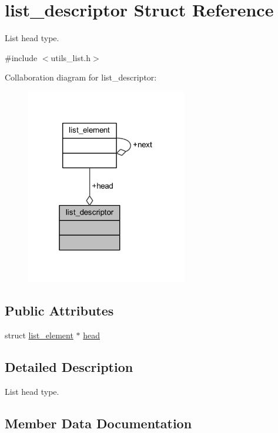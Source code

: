 \hypertarget{structlist__descriptor}{}\section{list\+\_\+descriptor Struct Reference}
\label{structlist__descriptor}


List head type.  




{\ttfamily \#include $<$utils\+\_\+list.\+h$>$}



Collaboration diagram for list\+\_\+descriptor\+:\nopagebreak
\begin{figure}[H]
\begin{center}
\leavevmode
\includegraphics[width=199pt]{structlist__descriptor__coll__graph}
\end{center}
\end{figure}
\subsection*{Public Attributes}
\begin{DoxyCompactItemize}
\item 
struct \hyperlink{structlist__element}{list\+\_\+element} $\ast$ \hyperlink{structlist__descriptor_acc7a3bb5c92dc985a2a7c27c958f1ed8}{head}
\end{DoxyCompactItemize}


\subsection{Detailed Description}
List head type. 

\subsection{Member Data Documentation}
\mbox{\label{structlist__descriptor_acc7a3bb5c92dc985a2a7c27c958f1ed8}} 
